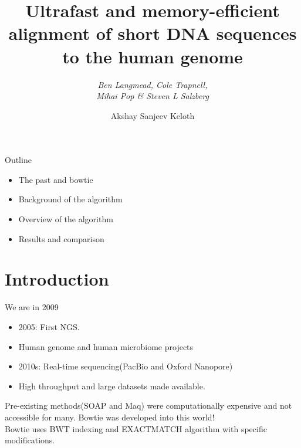 \documentclass[mathserif]{beamer}
\title{\textbf{Ultrafast and memory-efficient alignment of short DNA sequences
to the human genome }}
\subtitle{\textit{Ben Langmead, Cole Trapnell, \\Mihai Pop \& Steven L Salzberg}}
\author{Akshay Sanjeev Keloth}
\begin{document}
\begin{frame}
    \maketitle
\end{frame}

\begin{frame}{Outline }
    \begin{itemize}
        \item The past and bowtie
        \item Background of the algorithm
        \item Overview of the algorithm
        \item Results and comparison
    \end{itemize}
\end{frame}

\section{Introduction}
\begin{frame}{We are in 2009}
    \begin{itemize}
        \item 2005: First NGS.
        \item Human genome and human microbiome projects
        \item 2010s: Real-time sequencing(PacBio and Oxford Nanopore)
        \item High throughput and large datasets made available.
    \end{itemize}
    Pre-existing methods(SOAP and Maq) were computationally expensive and not accessible 
    for many. Bowtie was developed into this world!\\

    \vspace{5mm}
    Bowtie uses BWT indexing and EXACTMATCH algorithm with specific modifications. 
\end{frame}
\end{document}
